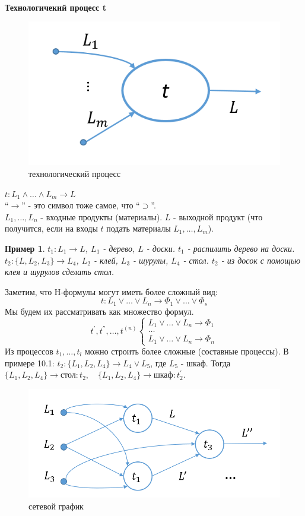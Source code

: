 \documentclass{article}
\newtheorem{example}{Пример}
\numberwithin{example}{section}
\numberwithin{question}{section}
\numberwithin{Remark}{section}
\numberwithin{theorem}{section}
\numberwithin{definition}{section}
\numberwithin{proposition}{section}
\begin{document}
\\
\textbf{Технологичекий процесс t}
\begin{figure}[!htp]
	\centering
	\includegraphics[width=0.3\linewidth]{10-1}
	\caption{технологический процесс}
	\label{fig:10-1}
\end{figure}
$t:L_1\wedge \ldots\wedge L_m\to L$\\
``$\to$'' - это символ тоже самое, что ``$\supset$''.\\
$L_1,\ldots,L_n$ - входные продукты (материалы). $L$ - выходной продукт (что получится, если на входы $t$ подать материалы $L_1,\ldots,L_m$).
\begin{example}
	$t_1:L_1\to L$, $L_1$ - дерево, $L$ - доски. $t_1$ - распилить дерево на доски.\\
	$t_2:\{L,L_2,L_3 \}\to L_4$, $L_2$ - клей, $L_3$ - шурулы, $L_4$ - стол. $t_2$ - из досок с помощью клея и шурулов сделать стол.
\end{example}
Заметим, что Н-формулы могут иметь более сложный вид: 
\begin{equation*}
t:L_1\vee \ldots\vee L_n\to \Phi_1\vee\ldots\vee \Phi_s
\end{equation*}
Мы будем их рассматривать как множество формул.
\begin{equation*}
t^{'},t^{''},\ldots,t^{(n)}\left\{\begin{array}{l}
L_1\vee \ldots\vee L_n\to \Phi_1\\
\ldots\\
L_1\vee \ldots\vee L_n\to \Phi_n
\end{array}\right.
\end{equation*}
Из процессов $t_1,\ldots,t_l$ можно строить более сложные (составные процессы). В примере 10.1: $t_2:\{L_1,L_2,L_4 \}\to L_4\vee L_5$, где $L_5$ - шкаф. Тогда $\{L_1,L_2,L_4 \}\to \text{стол}: t_2,\quad \{L_1,L_2,L_4 \}\to \text{шкаф}: t_2^{'}$.
\begin{figure}[!htp]
	\centering
	\includegraphics[width=0.3\linewidth]{10-2}
	\caption{сетевой график}
	\label{fig:10-2}
\end{figure}
\end{document}
